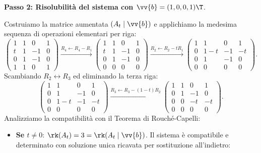 \begin{dimostrazione}
\textbf{Passo 2: Risolubilità del sistema con $\vv{b} = (1, 0, 0, 1)\T$}.

Costruiamo la matrice aumentata $(A_t \mid \vv{b})$ e applichiamo la medesima sequenza di operazioni elementari per riga:
\begin{equation}
    \begin{pmatrix}
        1 & 1 & 0 & 1 \\
        t & 1 & -1 & 0 \\
        0 & 1 & -1 & 0 \\
        1 & 1 & 0 & 1
    \end{pmatrix}
    \xrightarrow{R_4 \leftarrow R_4 - R_1}
    \begin{pmatrix}
        1 & 1 & 0 & 1 \\
        t & 1 & -1 & 0 \\
        0 & 1 & -1 & 0 \\
        0 & 0 & 0 & 0
    \end{pmatrix}
    \xrightarrow{R_2 \leftarrow R_2 - t R_1}
    \begin{pmatrix}
        1 & 1 & 0 & 1 \\
        0 & 1 - t & -1 & -t \\
        0 & 1 & -1 & 0 \\
        0 & 0 & 0 & 0
    \end{pmatrix}.
\end{equation}
Scambiando $R_2 \leftrightarrow R_3$ ed eliminando la terza riga:
\begin{equation}
    \begin{pmatrix}
        1 & 1 & 0 & 1 \\
        0 & 1 & -1 & 0 \\
        0 & 1 - t & -1 & -t \\
        0 & 0 & 0 & 0
    \end{pmatrix}
    \xrightarrow{R_3 \leftarrow R_3 - (1-t)R_2}
    \begin{pmatrix}
        1 & 1 & 0 & 1 \\
        0 & 1 & -1 & 0 \\
        0 & 0 & -t & -t \\
        0 & 0 & 0 & 0
    \end{pmatrix}.
\end{equation}
Analizziamo la compatibilità con il Teorema di Rouché-Capelli:
\begin{itemize}
    \item \textbf{Se $t \neq 0$}: $\rk(A_t) = 3 = \rk(A_t \mid \vv{b})$. Il sistema è compatibile e determinato con soluzione unica ricavata per sostituzione all'indietro:

\end{itemize}
\end{dimostrazione}
